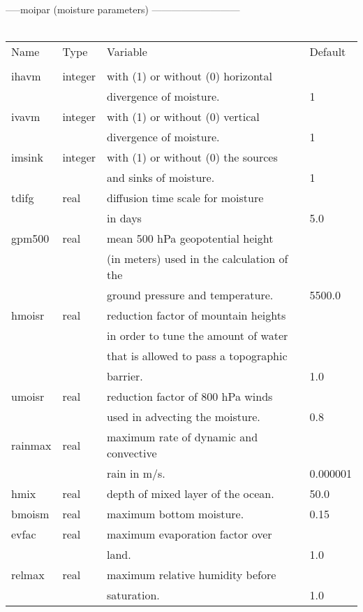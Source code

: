 -----moipar  (moisture parameters) ---------------------------      \\
\\
\begin{tabular}{llll}
Name  	&    Type   &	Variable			    &   Default    \\ 
\\
\hline
ihavm	&    integer&	with (1) or without (0) horizontal                 \\
	&	     &  divergence of moisture.		    &   1          \\
ivavm	&    integer &  with (1) or without (0) vertical                   \\
	&	     &  divergence of moisture.		    &   1          \\
imsink	&    integer &  with (1) or without (0) the sources                \\
	&	     &  and sinks of moisture.		    &	1          \\
tdifg   &    real    &  diffusion time scale for moisture                  \\
        &            &  in days                             &   5.0        \\
gpm500  &    real     & mean 500 hPa geopotential height                   \\
        &            &  (in meters) used in the calculation of the         \\
        &             & ground pressure and temperature.    &   5500.0     \\
hmoisr  &    real    &  reduction factor of mountain heights               \\
        &            &  in order to tune the amount of water               \\
        &            &  that is allowed to pass a topographic              \\
        &            &  barrier.                             &   1.0        \\
umoisr  &    real    &  reduction factor of 800 hPa winds                  \\
        &            &  used in advecting the moisture.     &   0.8        \\
rainmax &    real    &  maximum rate of dynamic and convective             \\
        &            &  rain in m/s.                        &   0.000001   \\
hmix    &    real    &	depth of mixed layer of the ocean.  &	50.0       \\
bmoism  &    real    &  maximum bottom moisture.	    &	0.15       \\
evfac	&    real    &	maximum evaporation factor over                    \\   
        &	     &  land.                               &   1.0        \\
relmax	&    real    &	maximum relative humidity before                   \\ 
	&	     &	saturation.  			    &	1.0        \\  \hline       
\end{tabular}
